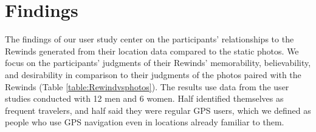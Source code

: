 \documentclass{sigchi}
\begin{document}
\section{Findings}
The findings of our user study center on the participants' relationships to the Rewinds generated from their location data compared to the static photos. We focus on the participants' judgments of their Rewinds' memorability, believability, and desirability in comparison to their judgments of the photos paired with the Rewinds (Table \ref{table:Rewindvsphotos}).
The results use data from the user studies conducted with 12 men and 6 women. Half identified themselves as frequent travelers, and half said they were regular GPS users, which we defined as people who use GPS navigation even in locations already familiar to them.
\end{document}
